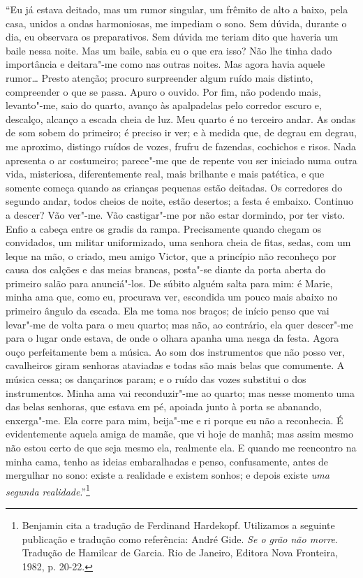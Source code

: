 ``Eu já estava deitado, mas um rumor singular, um frêmito de alto a
baixo, pela casa, unidos a ondas harmoniosas, me impediam o sono. Sem
dúvida, durante o dia, eu observara os preparativos. Sem dúvida me
teriam dito que haveria um baile nessa noite. Mas um baile, sabia eu o
que era isso? Não lhe tinha dado importância e deitara"-me como nas
outras noites. Mas agora havia aquele rumor\ldots{} Presto atenção; procuro
surpreender algum ruído mais distinto, compreender o que se passa. Apuro
o ouvido. Por fim, não podendo mais, levanto"-me, saio do quarto, avanço
às apalpadelas pelo corredor escuro e, descalço, alcanço a escada cheia
de luz. Meu quarto é no terceiro andar. As ondas de som sobem do
primeiro; é preciso ir ver; e à medida que, de degrau em degrau, me
aproximo, distingo ruídos de vozes, frufru de fazendas, cochichos e
risos. Nada apresenta o ar costumeiro; parece"-me que de repente vou ser
iniciado numa outra vida, misteriosa, diferentemente real, mais
brilhante e mais patética, e que somente começa quando as crianças
pequenas estão deitadas. Os corredores do segundo andar, todos cheios de
noite, estão desertos; a festa é embaixo. Continuo a descer? Vão ver"-me.
Vão castigar"-me por não estar dormindo, por ter visto. Enfio a cabeça
entre os gradis da rampa. Precisamente quando chegam os convidados, um
militar uniformizado, uma senhora cheia de fitas, sedas, com um leque na
mão, o criado, meu amigo Victor, que a princípio não reconheço por causa
dos calções e das meias brancas, posta"-se diante da porta aberta do
primeiro salão para anunciá"-los. De súbito alguém salta para mim: é
Marie, minha ama que, como eu, procurava ver, escondida um pouco mais
abaixo no primeiro ângulo da escada. Ela me toma nos braços; de início
penso que vai levar"-me de volta para o meu quarto; mas não, ao
contrário, ela quer descer"-me para o lugar onde estava, de onde o olhara
apanha uma nesga da festa. Agora ouço perfeitamente bem a música. Ao som
dos instrumentos que não posso ver, cavalheiros giram senhoras ataviadas
e todas são mais belas que comumente. A música cessa; os dançarinos
param; e o ruído das vozes substitui o dos instrumentos. Minha ama vai
reconduzir"-me ao quarto; mas nesse momento uma das belas senhoras, que
estava em pé, apoiada junto à porta se abanando, enxerga"-me. Ela corre
para mim, beija"-me e ri porque eu não a reconhecia. É evidentemente
aquela amiga de mamãe, que vi hoje de manhã; mas assim mesmo não estou
certo de que seja mesmo ela, realmente ela. E quando me reencontro na
minha cama, tenho as ideias embaralhadas e penso, confusamente, antes de
mergulhar no sono: existe a realidade e existem sonhos; e depois existe
\emph{uma segunda realidade}.''\footnote{Benjamin cita a tradução
  de Ferdinand Hardekopf. Utilizamos a seguinte publicação e tradução
  como referência: André Gide. \emph{Se o grão não morre}. Tradução de
  Hamilcar de Garcia. Rio de Janeiro, Editora Nova Fronteira, 1982, p.
  20-22. \versal{[N. T.]}}

